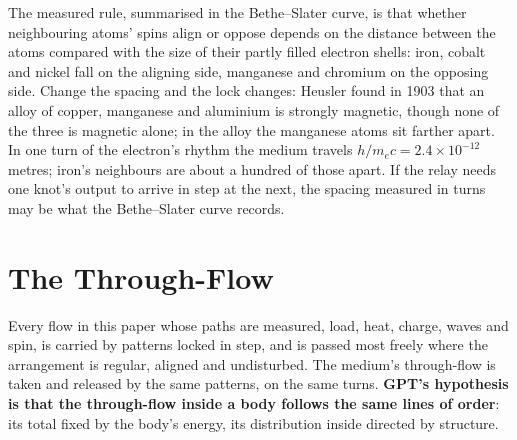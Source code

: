 \documentclass[11pt,a4paper]{article}
\begin{document}
 The measured rule, summarised in the Bethe--Slater curve, is that whether neighbouring atoms' spins align or oppose depends on the distance between the atoms compared with the size of their partly filled electron shells: iron, cobalt and nickel fall on the aligning side, manganese and chromium on the opposing side. Change the spacing and the lock changes: Heusler found in 1903 that an alloy of copper, manganese and aluminium is strongly magnetic, though none of the three is magnetic alone; in the alloy the manganese atoms sit farther apart.  In one turn of the electron's rhythm the medium travels $h/m_ec = 2.4\times10^{-12}$ metres; iron's neighbours are about a hundred of those apart. If the relay needs one knot's output to arrive in step at the next, the spacing measured in turns may be what the Bethe--Slater curve records.

\section{The Through-Flow}
\label{sec:through}

\begin{hypbar}
Every flow in this paper whose paths are measured, load, heat, charge, waves and spin, is carried by patterns locked in step, and is passed most freely where the arrangement is regular, aligned and undisturbed. The medium's through-flow is taken and released by the same patterns, on the same turns. \textbf{GPT's hypothesis is that the through-flow inside a body follows the same lines of order}: its total fixed by the body's energy, its distribution inside directed by structure.
\end{hypbar}
\end{document}
